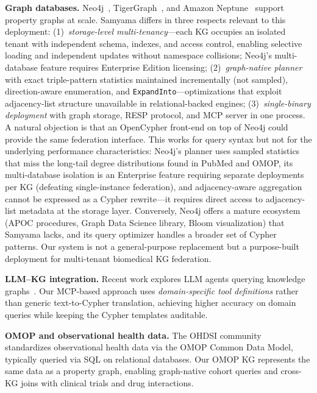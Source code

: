 \documentclass[runningheads]{llncs}
\begin{document}
\smallskip\noindent\textbf{Graph databases.}
Neo4j~\cite{neo4j}, TigerGraph~\cite{deutsch2019tigergraph},
and Amazon Neptune~\cite{neptune} support property graphs at
scale.  Samyama differs in three respects relevant to this
deployment:
(1)~\emph{storage-level multi-tenancy}---each KG occupies an
isolated tenant with independent schema, indexes, and access
control, enabling selective loading and independent updates
without namespace collisions; Neo4j's multi-database feature
requires Enterprise Edition licensing;
(2)~\emph{graph-native planner} with exact triple-pattern
statistics maintained incrementally (not sampled), direction-aware
enumeration, and \texttt{ExpandInto}---optimizations that exploit
adjacency-list structure unavailable in relational-backed engines;
(3)~\emph{single-binary deployment} with graph storage, RESP
protocol, and MCP server in one process.
A natural objection is that an OpenCypher front-end on top of
Neo4j could provide the same federation interface.  This works for
query syntax but not for the underlying performance characteristics:
Neo4j's planner uses sampled statistics that miss the long-tail
degree distributions found in PubMed and OMOP, its multi-database
isolation is an Enterprise feature requiring separate deployments
per KG (defeating single-instance federation), and adjacency-aware
aggregation cannot be expressed as a Cypher rewrite---it requires
direct access to adjacency-list metadata at the storage layer.
Conversely, Neo4j offers a mature ecosystem (APOC procedures,
Graph Data Science library, Bloom visualization) that Samyama
lacks, and its query optimizer handles a broader set of Cypher
patterns.  Our system is not a general-purpose replacement but
a purpose-built deployment for multi-tenant biomedical KG federation.

\smallskip\noindent\textbf{LLM--KG integration.}
Recent work explores LLM agents querying knowledge
graphs~\cite{pan2024unifying}.
Our MCP-based approach uses \emph{domain-specific tool
definitions} rather than generic text-to-Cypher translation,
achieving higher accuracy on domain queries while keeping the
Cypher templates auditable.

\smallskip\noindent\textbf{OMOP and observational health data.}
The OHDSI community~\cite{hripcsak2015omop} standardizes
observational health data via the OMOP Common Data Model,
typically queried via SQL on relational databases.  Our OMOP KG
represents the same data as a property graph, enabling
graph-native cohort queries and cross-KG joins with clinical
trials and drug interactions.
\end{document}

